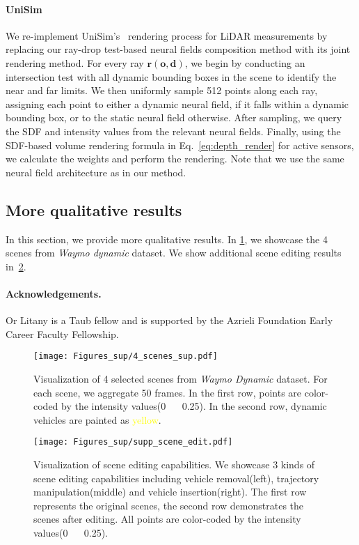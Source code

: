 \paragraph{UniSim} 
We re-implement UniSim's~\cite{yang2023unisim} rendering process for LiDAR measurements by replacing our ray-drop test-based neural fields composition method with its joint rendering method. For every ray $\mathbf{r} (\mathbf{o},\mathbf{d})$, we begin by conducting an intersection test with all dynamic bounding boxes in the scene to identify the near and far limits. We then uniformly sample 512 points along each ray, assigning each point to either a dynamic neural field, if it falls within a dynamic bounding box, or to the static neural field otherwise. After sampling, we query the SDF and intensity values from the relevant neural fields. Finally, using the SDF-based volume rendering formula in Eq.~\ref{eq:depth_render} for active sensors, we calculate the weights and perform the rendering. Note that we use the same neural field architecture as in our method.


\subsection{More qualitative results}
\label{sec:sup_visual}
In this section, we provide more qualitative results. In \cref{fig:4_scenes_supp}, we showcase the 4 scenes from \textit{Waymo dynamic} dataset. We show additional scene editing results in~\cref{fig:scene_editing_supp}. 

\paragraph{Acknowledgements.}
{Or Litany is a Taub fellow and is supported by the Azrieli Foundation Early Career Faculty Fellowship.}

\clearpage


\begin{figure}[t]
    \centering
     \texttt{[image: Figures\_sup/4\_scenes\_sup.pdf]}
     \caption{Visualization of 4 selected scenes from \textit{Waymo Dynamic} dataset. For each scene, we aggregate 50 frames. In the first row, points are color-coded by the intensity values(0 ~\bwrDyNFL~ 0.25). In the second row, dynamic vehicles are painted as \textcolor{yellow}{yellow}.}
     \label{fig:4_scenes_supp}
  \end{figure}
  
  \begin{figure}[t]
    \centering
     \texttt{[image: Figures\_sup/supp\_scene\_edit.pdf]}
     \caption{Visualization of scene editing capabilities. We showcase 3 kinds of scene editing capabilities including vehicle removal(left), trajectory manipulation(middle) and vehicle insertion(right). The first row represents the original scenes, the second row demonstrates the scenes after editing. All points are color-coded by the intensity values(0 ~\bwrDyNFL~ 0.25).}
     \label{fig:scene_editing_supp}
  \end{figure}


